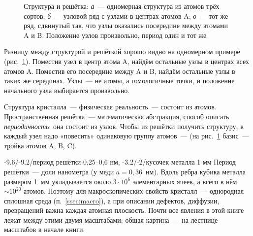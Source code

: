 \begin{figure}[ht]
\centering
{}
\caption{Структура и решётка: \textit{а}~— одномерная структура из атомов
трёх сортов; \textit{б}~— узловой ряд с узлами в центрах атомов A;
\textit{в}~— тот же ряд, сдвинутый так, что узлы оказались посередине
между атомами A и B. Положение узлов произвольно, период один и тот же}
\label{fig:row}
\end{figure}

Разницу между структурой и решёткой хорошо видно на одномерном примере
(рис.~\ref{fig:row}). Поместив узел в центр атома A, найдём остальные узлы
в центрах всех атомов A. Поместив его посередине между A и B, найдём
остальные узлы в таких же серединах. Узлы~— не атомы, а гомологичные
точки, и положение начального узла выбирается произвольно.

\begin{glavnoe}[Структура = решётка + базис]
Структура кристалла~— физическая реальность~— состоит из атомов.
Пространственная решётка~— математическая абстракция, способ описать
\emph{периодичность}: она состоит из узлов. Чтобы из решётки получить
структуру, в каждый узел надо «повесить» одинаковую группу атомов~—
 (на рис.~\ref{fig:row} базис~— тройка атомов A, B, C).
\end{glavnoe}

\begin{masshtab}{-9.6/-9.2/{период решётки 0,25--0,6 нм}, -3.2/-2/{кусочек металла 1 мм}}
Период решётки~— доли нанометра (у меди $a=0{,}36$~нм). Вдоль ребра
кубика металла размером 1~мм укладывается около $3\cdot10^6$
элементарных ячеек, а всего в нём $\sim10^{20}$ атомов. Поэтому для
макроскопических свойств кристалл~— однородная сплошная среда
(п.~\ref{ssec:macro}), а при описании дефектов, диффузии, превращений
важна каждая атомная плоскость. Почти все явления в этой книге лежат
между этими двумя масштабами; общая картина~— на лестнице масштабов в
начале книги.
\end{masshtab}

